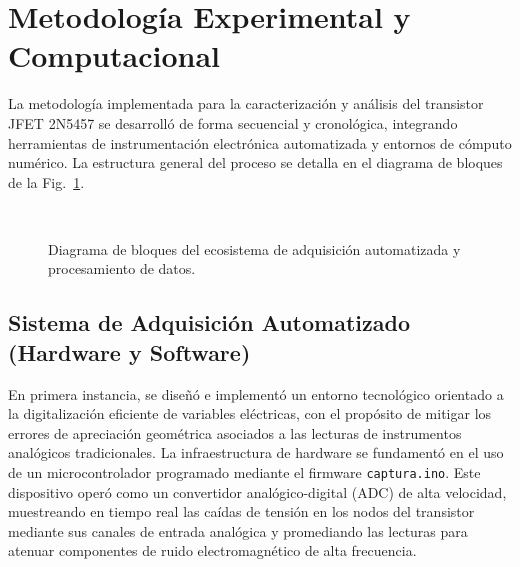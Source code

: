 \documentclass[conference]{IEEEtran}
\begin{document}
\section{Metodología Experimental y Computacional}
La metodología implementada para la caracterización y análisis del transistor
JFET 2N5457 se desarrolló de forma secuencial y cronológica, integrando
herramientas de instrumentación electrónica automatizada y entornos de cómputo
numérico. La estructura general del proceso se detalla en el diagrama de
bloques de la Fig.~\ref{fig:diagrama_bloques}.

\begin{figure}[htbp]
    \centering
    \caption{Diagrama de bloques del ecosistema de adquisición automatizada y procesamiento de datos.}~\label{fig:diagrama_bloques}
\end{figure}

\subsection{Sistema de Adquisición Automatizado (Hardware y Software)}
En primera instancia, se diseñó e implementó un entorno tecnológico orientado a
la digitalización eficiente de variables eléctricas, con el propósito de
mitigar los errores de apreciación geométrica asociados a las lecturas de
instrumentos analógicos tradicionales. La infraestructura de hardware se
fundamentó en el uso de un microcontrolador programado mediante el firmware
\texttt{captura.ino}. Este dispositivo operó como un convertidor
analógico-digital (ADC) de alta velocidad, muestreando en tiempo real las
caídas de tensión en los nodos del transistor mediante sus canales de entrada
analógica y promediando las lecturas para atenuar componentes de ruido
electromagnético de alta frecuencia.
\end{document}
